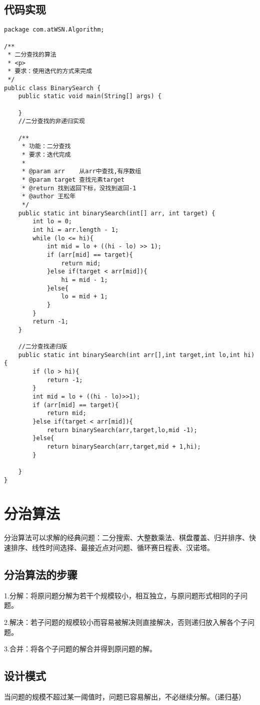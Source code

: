 \documentclass[a4paper]{report}
\begin{document}
\subsection{代码实现}
\begin{lstlisting}
package com.atWSN.Algorithm;

/**
 * 二分查找的算法
 * <p>
 * 要求：使用迭代的方式来完成
 */
public class BinarySearch {
    public static void main(String[] args) {

    }
    //二分查找的非递归实现

    /**
     * 功能：二分查找
     * 要求：迭代完成
     *
     * @param arr    从arr中查找,有序数组
     * @param target 查找元素target
     * @return 找到返回下标，没找到返回-1
     * @author 王松年
     */
    public static int binarySearch(int[] arr, int target) {
        int lo = 0;
        int hi = arr.length - 1;
        while (lo <= hi){
            int mid = lo + ((hi - lo) >> 1);
            if (arr[mid] == target){
                return mid;
            }else if(target < arr[mid]){
                hi = mid - 1;
            }else{
                lo = mid + 1;
            }
        }
        return -1;
    }

    //二分查找递归版
    public static int binarySearch(int arr[],int target,int lo,int hi){
        if (lo > hi){
            return -1;
        }
        int mid = lo + ((hi - lo)>>1);
        if (arr[mid] == target){
            return mid;
        }else if(target < arr[mid]){
            return binarySearch(arr,target,lo,mid -1);
        }else{
            return binarySearch(arr,target,mid + 1,hi);
        }

    }
}
\end{lstlisting}
\section{分治算法}
分治算法可以求解的经典问题：二分搜索、大整数乘法、棋盘覆盖、归并排序、快速排序、线性时间选择、最接近点对问题、循环赛日程表、汉诺塔。
\subsection{分治算法的步骤}
1.分解：将原问题分解为若干个规模较小，相互独立，与原问题形式相同的子问题。

2.解决：若子问题的规模较小而容易被解决则直接解决，否则递归放入解各个子问题。

3.合并：将各个子问题的解合并得到原问题的解。
\subsection{设计模式}
当问题的规模不超过某一阈值时，问题已容易解出，不必继续分解。（递归基）
\end{document}
